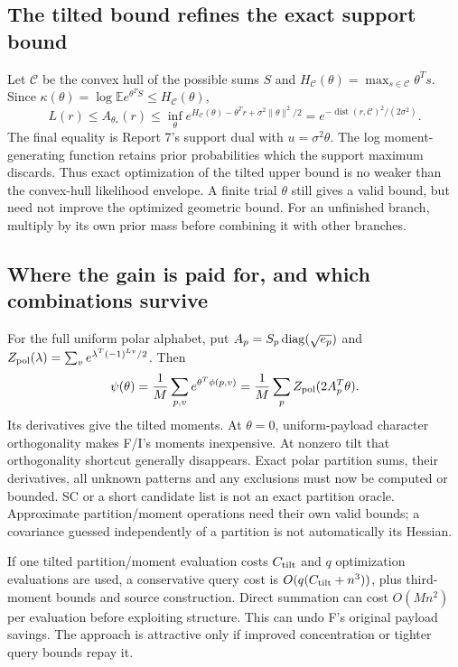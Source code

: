 \documentclass[10pt,a4paper]{article}
\newcommand{\E}{\mathbb E}
\begin{document}
\subsection{The tilted bound refines the exact support bound}
Let $\mathcal C$ be the convex hull of the possible sums $S$ and
$H_{\mathcal C}(\theta)=\max_{s\in\mathcal C}\theta^Ts$.
Since $\kappa(\theta)=\log\E e^{\theta^TS}\leq H_{\mathcal C}(\theta)$,
\begin{equation}
 L(r)\leq A_{\theta_*}(r)
 \leq\inf_\theta e^{H_{\mathcal C}(\theta)-\theta^Tr+\sigma^2\|\theta\|^2/2}
 =e^{-\operatorname{dist}(r,\mathcal C)^2/(2\sigma^2)}.
 \label{eq:tilt-versus-support}
\end{equation}
The final equality is Report 7's support dual with $u=\sigma^2\theta$.
The log moment-generating function retains prior probabilities which the support maximum discards.
Thus exact optimization of the tilted upper bound is no weaker than the convex-hull likelihood envelope.
A finite trial $\theta$ still gives a valid bound, but need not improve the optimized geometric bound.
For an unfinished branch, multiply by its own prior mass before combining it with other branches.

\subsection{Where the gain is paid for, and which combinations survive}
For the full uniform polar alphabet, put $A_p=S_p\operatorname{diag}(\sqrt{e_p})$ and
$Z_{\rm pol}(\lambda)=\sum_v e^{\lambda^T(-1)^{Lv}/2}$. Then
\[
 \psi(\theta)=\frac1M\sum_{p,v}e^{\theta^T\phi(p,v)}
 =\frac1M\sum_p Z_{\rm pol}(2A_p^T\theta).
\]
Its derivatives give the tilted moments. At $\theta=0$, uniform-payload character orthogonality makes
F/I's moments inexpensive. At nonzero tilt that orthogonality shortcut generally disappears. Exact polar
partition sums, their derivatives, all unknown patterns and any exclusions must now be computed or bounded.
SC or a short candidate list is not an exact partition oracle. Approximate partition/moment operations
need their own valid bounds; a covariance guessed independently of a partition is not automatically its Hessian.

If one tilted partition/moment evaluation costs $C_{\rm tilt}$ and $q$ optimization evaluations are used,
a conservative query cost is $O(q(C_{\rm tilt}+n^3))$, plus third-moment bounds and source construction.
Direct summation can cost $O(Mn^2)$ per evaluation before exploiting structure. This can undo F's original
payload savings. The approach is attractive only if improved concentration or tighter query bounds repay it.
\end{document}
